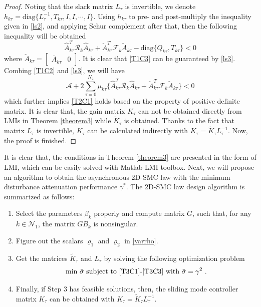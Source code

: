 \documentclass[journal,final,twocolumn]{IEEEtran}
\begin{document}
\begin{proof}
	 Noting that the slack matrix $L_{\tau }$ is invertible, we denote $h_{k\tau }= \mathrm{diag}\{L^{-1}_{\tau }, T_{k\tau }, I, I,\cdots, I \}$. Using $h_{k\tau }$ to  pre- and post-multiply the inequality given in \eqref{ls2}, and applying Schur complement after that, then the following inequality will be obtained
	 \begin{equation} \label{ls3}
	 	\hat{A}^{T}_{k\tau }\mathcal{R}_{k}\hat{A}_{k\tau } + \check{A}^{T}_{k\tau }\mathcal{F}_{k}\check{A}_{k\tau }  - \mathrm{diag}\{Q_{k\tau }, T_{k\tau }\} < 0  
	 \end{equation}
	 where $\check{A}_{k\tau }=\begin{bmatrix}
	 \bar{A}_{k\tau }&0
	 \end{bmatrix}$. It is clear that \eqref{T1C3} can be guaranteed by \eqref{ls3}. \\
	 Combing \eqref{T1C2} and \eqref{ls3},  we will have
	 \begin{equation}
	 	\mathcal{A} +2\sum_{\tau =0}^{N_{2}}\mu_{k\tau }\Big\{ \hat{A}^{T}_{k\tau }\mathcal{R}_{k}\hat{A}_{k\tau } + \check{A}^{T}_{k\tau }\mathcal{F}_{k}\check{A}_{k\tau } \Big\} < 0
	 \end{equation}
	 which further implies \eqref{T2C1} holds based on the property of positive definite matrix. It is clear that, the gain matrix $K_{\tau }$ can not be obtained directly from LMIs in Theorem \ref{theorem3} while $\tilde{K}_{\tau }$ is obtained. Thanks  to the fact that matrix $L_{\tau }$ is invertible, $K_{\tau }$ can be calculated indirectly with $K_{\tau }=\tilde{K}_{\tau }L^{-1}_{\tau }$. Now, the proof is finished.
\end{proof}


	It is clear that, the conditions in Theorem \ref{theorem3} are presented in the form of LMI, which can be easily solved with Matlab LMI toolbox. Next, we will propose an algorithm to obtain the asynchronous 2D-SMC law with the minimum disturbance attenuation performance $\gamma^{*}$. The  2D-SMC law design algorithm is summarized  as follows:
	\begin{enumerate}
		\item Select the parameters $\beta_{k}$ properly and compute matrix $G$, such that, for any $k\in\mathcal{N}_{1}$,  the  matrix $GB_{k}$ is nonsingular.
		\item Figure out the scalars $\varrho_{1}$ and $\varrho_{2}$ in \eqref{varrho}.
		\item Get the matrices  $\tilde{K}_{\tau }$ and $L_{\tau }$ by solving the  following optimization problem
		\begin{equation}\label{optimization-problem}
		\text{min $\tilde{\sigma}$ subject to \eqref{T3C1}-\eqref{T3C3} with $\tilde\sigma=\gamma^{2}$ }.
		\end{equation}
		\item Finally, if Step 3 has feasible solutions, then, the sliding mode controller matrix $K_{\tau }$ can be obtained with $K_{\tau }= \tilde{K}_{\tau }L^{-1}_{\tau }$.
	\end{enumerate}
\end{document}
